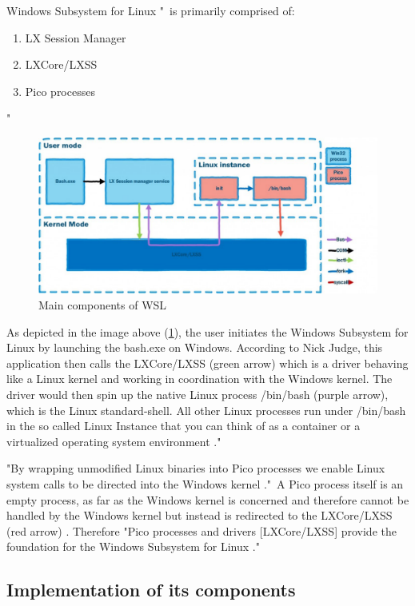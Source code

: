 \documentclass[utf8,biblatex, ngerman, english]{lni}
\begin{document}
Windows Subsystem for Linux "\ is primarily comprised of: 
\begin{enumerate}
    \item LX Session Manager
    \item LXCore/LXSS
    \item Pico processes
\end{enumerate} \cite{Ha16b}"

\begin{figure}
  \centering
  \includegraphics[width=1\textwidth]{WSL Architecture.pdf}
  \caption{Main components of WSL \cite{Ha16b}}
  \label{img:architecture}
\end{figure}

As depicted in the image above (\ref{img:architecture}), the user initiates the Windows Subsystem for Linux by launching the bash.exe on Windows. According to Nick Judge, this application then calls the LXCore/LXSS (green arrow) which is a driver behaving like a Linux kernel and working in coordination with the Windows kernel. The driver would then spin up the native Linux process /bin/bash (purple arrow), which is the Linux standard-shell. All other Linux processes run under /bin/bash in the so called Linux Instance that you can think of as a container or a virtualized operating system environment \cite{Ha16a}."

"By wrapping unmodified Linux binaries into Pico processes we enable Linux system calls to be directed into the Windows kernel \cite{Ha16b}."\ A Pico process itself is an empty process, as far as the Windows kernel is concerned and therefore cannot be handled by the Windows kernel but instead is redirected to the LXCore/LXSS (red arrow) \cite{Ha16a}.
Therefore "Pico processes and drivers [LXCore/LXSS] provide the foundation for the Windows Subsystem for Linux \cite{Ha16b}."

\subsection{Implementation of its components}
\end{document}
